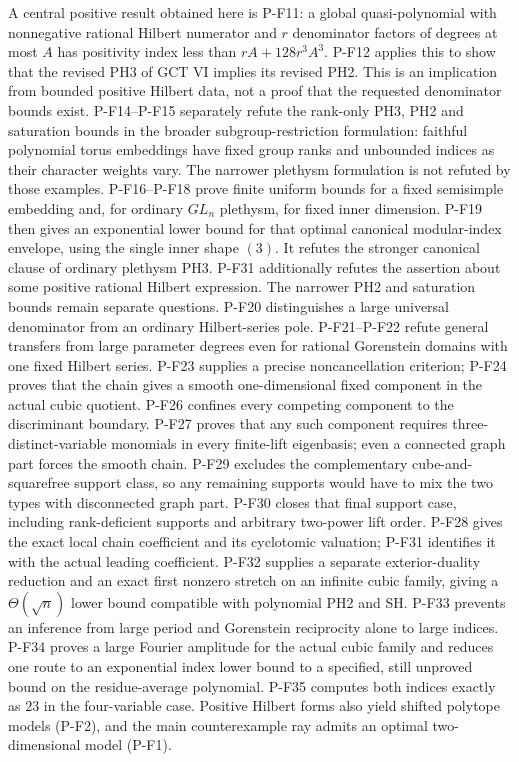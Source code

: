 A central positive result obtained here is P-F11: a global
quasi-polynomial with nonnegative rational Hilbert numerator and
$r$ denominator factors of degrees at most $A$ has positivity index
less than $rA+128r^3A^3$. P-F12 applies this to show that the revised
PH3 of GCT VI implies its revised PH2. This is an implication from
bounded positive Hilbert data, not a proof that the requested
denominator bounds exist.
P-F14--P-F15 separately refute the rank-only PH3, PH2 and saturation
bounds in the broader subgroup-restriction formulation: faithful
polynomial torus embeddings have fixed group ranks and unbounded
indices as their character weights vary. The narrower plethysm
formulation is not refuted by those examples.
P-F16--P-F18 prove finite uniform bounds for a fixed semisimple
embedding and, for ordinary $GL_n$ plethysm, for fixed inner dimension.
P-F19 then gives an exponential lower bound for that optimal canonical
modular-index envelope, using the single inner shape $(3)$.
It refutes the stronger canonical clause of ordinary plethysm PH3.
P-F31 additionally refutes the assertion about some positive rational
Hilbert expression. The narrower PH2 and saturation bounds remain
separate questions.
P-F20 distinguishes a large universal denominator from an ordinary
Hilbert-series pole. P-F21--P-F22 refute general transfers from large
parameter degrees even for rational Gorenstein domains with one fixed
Hilbert series. P-F23 supplies a precise noncancellation criterion;
P-F24 proves that the chain gives a smooth one-dimensional fixed
component in the actual cubic quotient. P-F26 confines every competing component
to the discriminant boundary. P-F27 proves that any such component
requires three-distinct-variable monomials in every finite-lift
eigenbasis; even a connected graph part forces the smooth chain.
P-F29 excludes the complementary cube-and-squarefree support class,
so any remaining supports would have to mix the two types with
disconnected graph part. P-F30 closes that final support case,
including rank-deficient supports and arbitrary two-power lift order.
P-F28 gives the exact local chain coefficient and its cyclotomic
valuation; P-F31 identifies it with the actual leading coefficient.
P-F32 supplies a separate exterior-duality reduction and an exact
first nonzero stretch on an infinite cubic family, giving a
$\Theta(\sqrt n)$ lower bound compatible with polynomial PH2 and SH.
P-F33 prevents an inference from large period and Gorenstein
reciprocity alone to large indices. P-F34 proves a large Fourier
amplitude for the actual cubic family and reduces one route to
an exponential index lower bound to a specified, still unproved
bound on the residue-average polynomial. P-F35 computes both
indices exactly as $23$ in the four-variable case.
Positive Hilbert forms also yield
shifted polytope models (P-F2), and the main counterexample ray admits
an optimal two-dimensional model (P-F1).

